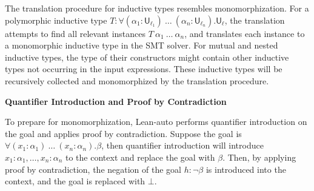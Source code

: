   The translation procedure for inductive types resembles monomorphization. For a polymorphic inductive type
  $T : \forall (\alpha_1 : \mathsf{U}_{\ell_1}) \ \dots \ (\alpha_n : \mathsf{U}_{\ell_n}). \mathsf{U}_\ell$,
  the translation attempts to find all relevant instances $T \ \alpha_1 \ \dots \ \alpha_n$,
  and translates each instance to a monomorphic inductive type in the SMT solver.
  For mutual and nested inductive types, the type of their constructors might contain
  other inductive types not occurring in the input expressions. These inductive
  types will be recursively collected and monomorphized by the translation procedure.

\noindent \textbf{Quantifier Introduction and Proof by Contradiction}

  To prepare for monomorphization, Lean-auto performs quantifier introduction on the goal and
  applies proof by contradiction. Suppose the goal is $\forall (x_1 : \alpha_1) \ \dots \ (x_n : \alpha_n). \beta$, 
  then quantifier introduction will introduce $x_1 : \alpha_1, \dots, x_n : \alpha_n$ to the context and replace
  the goal with $\beta$. Then, by applying proof by contradiction, the negation of
  the goal $h : \neg \beta$ is introduced into the context, and the goal is replaced
  with $\bot$.